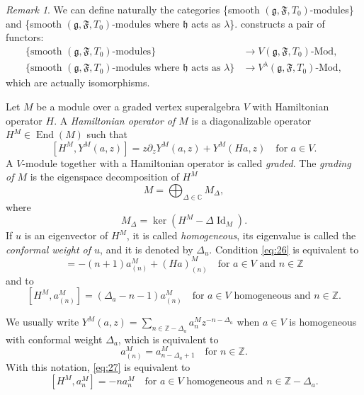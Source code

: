 \documentclass[a4paper, 12pt, reqno]{amsart}
\theoremstyle{remark}
\newtheorem{remark}[theorem]{Remark}
\DeclareMathOperator{\Id}{Id}
\DeclareMathOperator{\End}{End}
\begin{document}
\begin{remark}
  \label{rmk:23}
  We can define naturally the categories \{smooth $(\mathfrak{g}, \mathfrak{F}, T_0)$-modules\} and \{smooth $(\mathfrak{g}, \mathfrak{F}, T_0)$-modules where $\mathfrak{h}$ acts as $\lambda$\}.
   constructs a pair of functors:
  \begin{align*}
    \{\text{smooth $(\mathfrak{g}, \mathfrak{F}, T_0)$-modules}\} &\to \text{$V(\mathfrak{g}, \mathfrak{F}, T_0)$-Mod}, \\
    \{\text{smooth $(\mathfrak{g}, \mathfrak{F}, T_0)$-modules where $\mathfrak{h}$ acts as $\lambda$}\} &\to \text{$V^{\lambda}(\mathfrak{g}, \mathfrak{F}, T_0)$-Mod},
  \end{align*}
  which are actually isomorphisms.
\end{remark}

Let $M$ be a module over a graded vertex superalgebra $V$ with Hamiltonian operator $H$.
A \emph{Hamiltonian operator of $M$} is a diagonalizable operator $H^M \in \End(M)$ such that
\begin{equation}
  \label{eq:26}
  [H^M, Y^M(a, z)] = z\partial_zY^M(a, z) + Y^M(Ha, z) \quad \text{for $a \in V$}.
\end{equation}
A $V$-module together with a Hamiltonian operator is called \emph{graded}.
The \emph{grading of $M$} is the eigenspace decomposition of $H^M$
\begin{equation*}
  M = \bigoplus_{\Delta \in \mathbb{C}}M_{\Delta},
\end{equation*}
where
\begin{equation*}
  M_{\Delta} = \ker(H^M - \Delta\Id_M).
\end{equation*}
If $u$ is an eigenvector of $H^M$, it is called \emph{homogeneous}, its eigenvalue is called the \emph{conformal weight of $u$}, and it is denoted by $\Delta_u$.
Condition \eqref{eq:26} is equivalent to
\begin{equation*}
  [H^M, a^M_{(n)}] = -(n + 1)a^M_{(n)} + (Ha)^M_{(n)} \quad \text{for $a \in V$ and $n \in \mathbb{Z}$}
\end{equation*}
and to
\begin{equation}
  \label{eq:27}
  [H^M, a^M_{(n)}] = (\Delta_a - n - 1)a^M_{(n)} \quad \text{for $a \in V$ homogeneous and $n \in \mathbb{Z}$}.
\end{equation}

We usually write $Y^M(a, z) = \sum_{n \in \mathbb{Z} - \Delta_a}a^M_nz^{-n - \Delta_a}$ when $a \in V$ is homogeneous with conformal weight $\Delta_a$, which is equivalent to
\begin{equation*}
  a^M_{(n)} = a^M_{n - \Delta_a + 1} \quad \text{for $n \in \mathbb{Z}$}.
\end{equation*}
With this notation, \eqref{eq:27} is equivalent to
\begin{equation}
  \label{eq:28}
  [H^M, a^M_n] = -na^M_n \quad \text{for $a \in V$ homogeneous and $n \in \mathbb{Z} - \Delta_a$}.
\end{equation}
\end{document}
